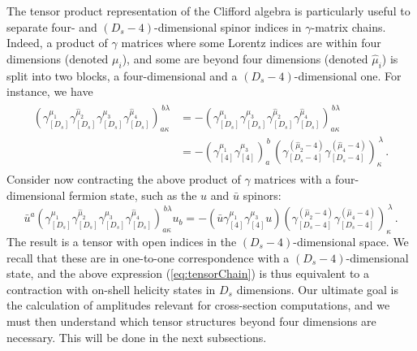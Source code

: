 The tensor product representation of the Clifford algebra is
particularly useful to separate four- and 
$(D_s-4)$-dimensional spinor indices in $\gamma$-matrix chains. 
Indeed, a product of
$\gamma$ matrices where some
Lorentz indices are within four dimensions (denoted
$\mu_i$),
and some are beyond four dimensions (denoted $\hat\mu_i$) is
split into two blocks, a four-dimensional and a 
$(D_s-4)$-dimensional one. For instance, we have
\begin{align}
  \begin{split}
    \left(\gamma_{[D_s]}^{\mu_1}
    \gamma_{[D_s]}^{\hat \mu_2}
    \gamma_{[D_s]}^{\mu_3}
    \gamma_{[D_s]}^{\hat\mu_4}\right)_{a\kappa}^{\,b\lambda} &=
    -\left(
    \gamma_{[D_s]}^{\mu_1}
    \gamma_{[D_s]}^{\mu_3}
    \gamma_{[D_s]}^{\hat \mu_2}
    \gamma_{[D_s]}^{\hat\mu_4} \right)_{a\kappa}^{\,b\lambda} \\
    &=-\left( 
    \gamma_{[4]}^{\mu_1}
    \gamma_{[4]}^{\mu_3}
    \right)_a^{\,b}   \,\left(
    \gamma_{[D_s-4]}^{(\hat \mu_2-4)}
    \gamma_{[D_s-4]}^{(\hat \mu_4-4)}
    \right)_\kappa^{\,\lambda}  \,.
  \end{split}
\end{align}
Consider now contracting the above
product of $\gamma$ matrices with a four-dimensional fermion state,
such as the $u$ and $\bar u$ spinors:
\begin{equation}
	\label{eq:tensorChain}
	\bar u^a
	\left(\gamma_{[D_s]}^{\mu_1}
	\gamma_{[D_s]}^{\hat \mu_2}
	\gamma_{[D_s]}^{\mu_3}
	\gamma_{[D_s]}^{\hat\mu_4}\right)_{a\kappa}^{\,b\lambda}
	u_b=
	-\left(\bar u
	\gamma_{[4]}^{\mu_1}
	\gamma_{[4]}^{\mu_3}
	u\right)
	\left(
	\gamma_{[D_s-4]}^{(\hat \mu_2-4)}
	\gamma_{[D_s-4]}^{(\hat \mu_4-4)}
	\right)_\kappa^{\,\lambda}\,.
\end{equation}
The result is a tensor with open indices in the
$(D_s-4)$-dimensional space.
We recall that these are in one-to-one
correspondence with a $(D_s-4)$-dimensional state, and the above expression (\ref{eq:tensorChain}) is
thus equivalent to a contraction with on-shell helicity states in $D_s$ dimensions.
%
Our ultimate goal is the calculation of amplitudes relevant for 
cross-section computations, and we must then understand which
tensor structures beyond four dimensions are necessary. 
This will be done in the next subsections.

